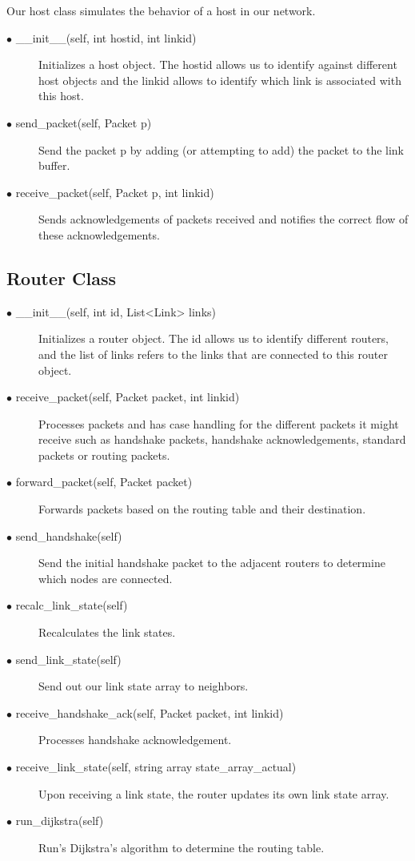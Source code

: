 \documentclass{article}
\begin{document}
Our host class simulates the behavior of a host in our network.

\begin{description}
	\item [$\bullet$ \_\_init\_\_(self, int hostid, int linkid)] Initializes a host object. The hostid allows us to identify against different host objects and the linkid allows to identify which link is associated with this host.
	\item [$\bullet$ send\_packet(self, Packet p)] Send the packet p by adding (or attempting to add) the packet to the link buffer.
	\item [$\bullet$ receive\_packet(self, Packet p, int linkid)] Sends acknowledgements of packets received and notifies the correct flow of these acknowledgements.
\end{description}

\subsection{Router Class}

\begin{description}
	\item [$\bullet$ \_\_init\_\_(self, int id, List<Link> links)] Initializes a router object. The id allows us to identify different routers, and the list of links refers to the links that are connected to this router object. 
	\item [$\bullet$ receive\_packet(self, Packet packet, int linkid)]  Processes packets and has case handling for the different packets it might receive such as handshake packets, handshake acknowledgements, standard packets or routing packets. 
	\item [$\bullet$ forward\_packet(self, Packet packet)] Forwards packets based on the routing table and their destination.
	\item [$\bullet$ send\_handshake(self)] Send the initial handshake packet to the adjacent routers to determine which nodes are connected.
	\item [$\bullet$ recalc\_link\_state(self)] Recalculates the link states.
	\item [$\bullet$ send\_link\_state(self)] Send out our link state array to neighbors.
	\item [$\bullet$ receive\_handshake\_ack(self, Packet packet, int linkid)] Processes handshake acknowledgement.
	\item [$\bullet$ receive\_link\_state(self, string array  state\_array\_actual)] Upon receiving a link state, the router updates its own link state array.
	\item [$\bullet$ run\_dijkstra(self)] Run's Dijkstra's algorithm to determine the routing table.
\end{description}
\end{document}
